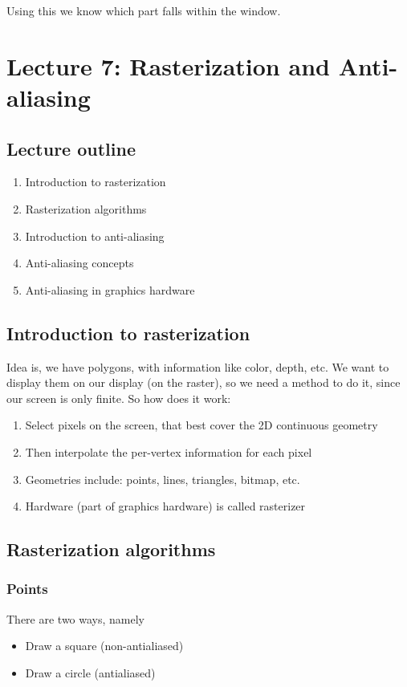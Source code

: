 \documentclass[11pt]{article}
\begin{document}
Using this we know which part falls within the window.

\section{Lecture 7: Rasterization and Anti-aliasing}
\subsection*{Lecture outline}
\begin{enumerate}
    \item Introduction to rasterization
    \item Rasterization algorithms
    \item Introduction to anti-aliasing
    \item Anti-aliasing concepts
    \item Anti-aliasing in graphics hardware
\end{enumerate}

\subsection{Introduction to rasterization}
Idea is, we have polygons, with information like color, depth, etc. We want to display them on our display (on the raster), so we need a method to do it, since our screen is only finite.
So how does it work:
\begin{enumerate}
    \item Select pixels on the screen, that best cover the 2D continuous geometry
    \item Then interpolate the per-vertex information for each pixel
    \item Geometries include: points, lines, triangles, bitmap, etc.
    \item Hardware (part of graphics hardware) is called rasterizer
\end{enumerate}

\subsection{Rasterization algorithms}
\subsubsection*{Points}
There are two ways, namely
\begin{itemize}
    \item Draw a square (non-antialiased)
    \item Draw a circle (antialiased)
\end{itemize}
\end{document}
